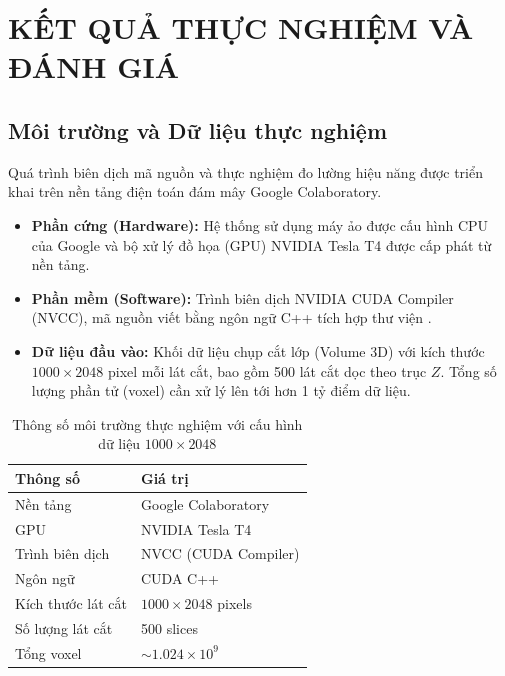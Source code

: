 
\chapter{KẾT QUẢ THỰC NGHIỆM VÀ ĐÁNH GIÁ}

\label{Chapter4}


\section{Môi trường và Dữ liệu thực nghiệm}

Quá trình biên dịch mã nguồn và thực nghiệm đo lường hiệu năng được triển khai trên nền tảng điện toán đám mây Google Colaboratory.

\begin{itemize}
    \item \textbf{Phần cứng (Hardware):} Hệ thống sử dụng máy ảo được cấu hình CPU của Google và bộ xử lý đồ họa (GPU) NVIDIA Tesla T4 được cấp phát từ nền tảng.
    
    \item \textbf{Phần mềm (Software):} Trình biên dịch NVIDIA CUDA Compiler (NVCC), mã nguồn viết bằng ngôn ngữ C++ tích hợp thư viện .
    
    \item \textbf{Dữ liệu đầu vào:} Khối dữ liệu chụp cắt lớp (Volume 3D) với kích thước $1000 \times 2048$ pixel mỗi lát cắt, bao gồm 500 lát cắt dọc theo trục $Z$. Tổng số lượng phần tử (voxel) cần xử lý lên tới hơn 1 tỷ điểm dữ liệu.
\end{itemize}

\begin{table}[h!]
\caption{Thông số môi trường thực nghiệm với cấu hình dữ liệu $1000 \times 2048$}
\label{tab:env}
\centering
\begin{tabular}{l l}
    \toprule
    \textbf{Thông số} & \textbf{Giá trị} \\
    \midrule
    Nền tảng & Google Colaboratory \\
    GPU & NVIDIA Tesla T4 \\
    Trình biên dịch & NVCC (CUDA Compiler) \\
    Ngôn ngữ & CUDA C++ \\
    Kích thước lát cắt & $1000 \times 2048$ pixels \\
    Số lượng lát cắt & 500 slices \\
    Tổng voxel & $\sim 1.024 \times 10^9$ \\
    \bottomrule
\end{tabular}
\end{table}


